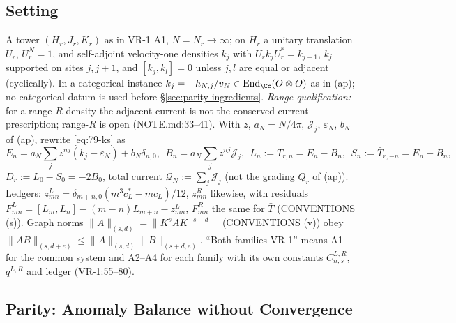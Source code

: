 \subsection{Setting}

A tower \((H_r,J_r,K_r)\) as in VR-1 A1, \(N=N_r\to\infty\); on \(H_r\) a unitary translation \(U_r\), \(U_r^N=1\),
and self-adjoint velocity-one densities \(k_j\) with \(U_rk_jU_r^*=k_{j+1}\), \(k_j\) supported on sites \(j,j+1\), and
\([k_j,k_l]=0\) unless \(j,l\) are equal or adjacent (cyclically).  In a categorical instance \(k_j=-h_{N,j}/v_N\in
\operatorname{End}_\Cc(O\otimes O)\) as in (ap); no categorical datum is used before
\S\ref{sec:parity-ingredients}.  \emph{Range qualification:} for a range-\(R\) density the adjacent current is not the
conserved-current prescription; range-\(R\) is open (NOTE.md:33--41).  With \(z\), \(a_N=N/4\pi\), \(\mathcal J_j\),
\(\varepsilon_N\), \(b_N\) of (ap), rewrite \eqref{eq:79-ks} as
\begin{equation}\label{eq:91-modes}
  E_n=a_N\sum_jz^{nj}(k_j-\varepsilon_N)+b_N\delta_{n,0},\ \ B_n=a_N\sum_jz^{nj}\mathcal J_j,\ \
  L_n:=T_{r,n}=E_n-B_n,\ \ S_n:=\bar T_{r,-n}=E_n+B_n,
\end{equation}
\(D_r:=L_0-S_0=-2B_0\), total current \(\mathcal Q_N:=\sum_j\mathcal J_j\) (not the grading \(Q_r\) of (ap)).  Ledgers:
\(z^{L}_{mn}=\delta_{m+n,0}(m^3c_L^*-mc_L)/12\), \(z^R_{mn}\) likewise, with residuals \(F^L_{mn}=[L_m,L_n]-(m-n)L_{m+n}
-z^L_{mn}\), \(F^R_{mn}\) the same for \(\bar T\) (CONVENTIONS (s)).  Graph norms \(\|A\|_{(s,d)}=\|K^sAK^{-s-d}\|\) (CONVENTIONS
(v)) obey \(\|AB\|_{(s,d+e)}\le\|A\|_{(s,d)}\|B\|_{(s+d,e)}\).  ``Both families VR-1'' means A1 for the common system and
A2--A4 for each family with its own constants \(C^{L,R}_{n,s}\), \(q^{L,R}\) and ledger (VR-1:55--80).

\subsection{Parity: Anomaly Balance without Convergence}

